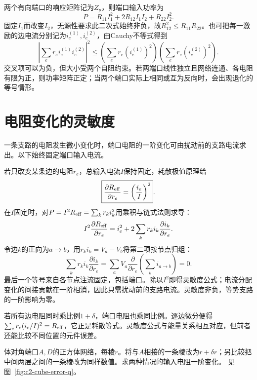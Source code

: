 


两个有向端口的响应矩阵记为$Z_p$，则端口输入功率为
\[
 P=R_{11}I_1^2+2R_{12}I_1I_2+R_{22}I_2^2.
\]
固定$I_1$而改变$I_2$，无源性要求此二次式始终非负，故$R_{12}^2\le R_{11}R_{22}$。也可把每一激励的边电流分别记为$i_e^{(1)},i_e^{(2)}$，由Cauchy不等式得到
\[
 \left|\sum_e r_ei_e^{(1)}i_e^{(2)}\right|^2
 \le\left(\sum_e r_e(i_e^{(1)})^2\right)
       \left(\sum_e r_e(i_e^{(2)})^2\right).
\]
交叉项可以为负，但大小受两个自阻约束。若两端口线性独立且网络连通、各电阻有限为正，则功率矩阵正定；当两个端口实际上相同或互为反向时，会出现退化的等号情形。


\section{电阻变化的灵敏度}
一条支路的电阻发生微小变化时，端口电阻的一阶变化可由扰动前的支路电流求出。以下始终固定端口输入电流。

若只改变某条边的电阻$r_e$，总输入电流$I$保持固定，耗散极值原理给
\[
 \boxed{\frac{\partial R_{\rm eff}}{\partial r_e}
 =\left(\frac{i_e}I\right)^2}.
\]
在$I$固定时，对$P=I^2R_{\rm eff}=\sum_k r_ki_k^2$用乘积与链式法则求导：
\[I^2\frac{\partial R_{\rm eff}}{\partial r_e}
=i_e^2+2\sum_k r_ki_k\frac{\partial i_k}{\partial r_e}.\]
令边$k$的正向为$a\to b$，用$r_ki_k=V_a-V_b$将第二项按节点归组：
\[\sum_k r_ki_k\frac{\partial i_k}{\partial r_e}
=\sum_aV_a\frac{\partial}{\partial r_e}
\left(\sum_bi_{a\to b}\right)=0.\]
最后一个等号来自各节点注流固定，包括端口。除以$I^2$即得灵敏度公式；电流分配变化的间接贡献在一阶相消，因此只需扰动前的支路电流。灵敏度非负，等势支路的一阶影响为零。

若所有边电阻同时乘比例$1+\delta$，端口电阻也乘同比例。逐边微分便得$\sum_e r_e(i_e/I)^2=R_{\rm eff}$，它正是耗散等式。灵敏度公式与能量关系相互对应，但前者还能比较不同位置的元件误差。

\begin{example}[正方体单棱误差的不同影响]\label{ex:c2-cube-error}
体对角端口$A,D$的正方体网络，每棱$r$。将与$A$相接的一条棱改为$r+\delta r$；另比较把中间两层之间的一条棱改为同样数值。求两种情况的输入电阻一阶变化。 见图~\ref{fig:c2-cube-error-q}。
\end{example}

